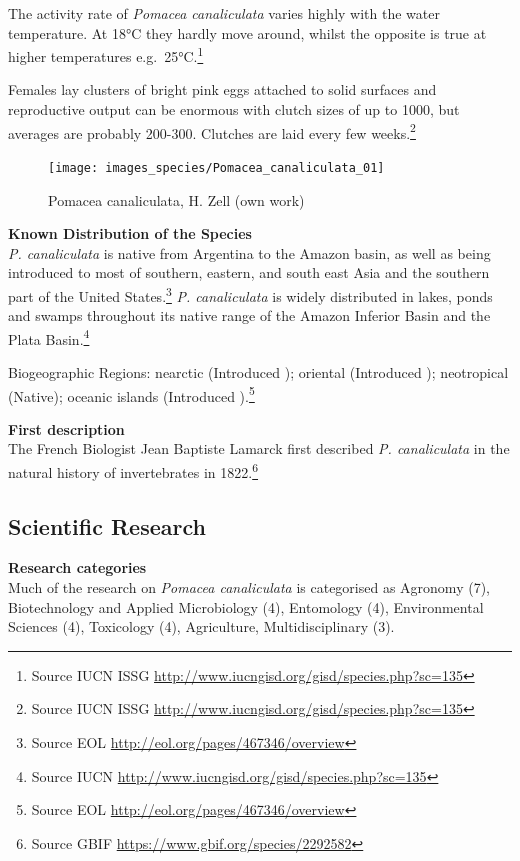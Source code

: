 \documentclass[]{book}
\let\rmarkdownfootnote\footnote%
\def\footnote{\protect\rmarkdownfootnote}
\theoremstyle{definition}
\theoremstyle{definition}
\theoremstyle{definition}
\theoremstyle{remark}
\begin{document}
The activity rate of \emph{Pomacea canaliculata} varies highly with the
water temperature. At 18°C they hardly move around, whilst the opposite
is true at higher temperatures e.g.~25°C.\footnote{Source IUCN ISSG
  \url{http://www.iucngisd.org/gisd/species.php?sc=135}}

Females lay clusters of bright pink eggs attached to solid surfaces and
reproductive output can be enormous with clutch sizes of up to 1000, but
averages are probably 200-300. Clutches are laid every few
weeks.\footnote{Source IUCN ISSG
  \url{http://www.iucngisd.org/gisd/species.php?sc=135}}

\begin{figure}

{\centering \texttt{[image: images\_species/Pomacea\_canaliculata\_01]} 

}

\caption{Pomacea canaliculata, H. Zell (own work)}\label{fig:unnamed-chunk-9}
\end{figure}

\textbf{Known Distribution of the Species}\\
\emph{P. canaliculata} is native from Argentina to the Amazon basin, as
well as being introduced to most of southern, eastern, and south east
Asia and the southern part of the United States.\footnote{Source EOL
  \url{http://eol.org/pages/467346/overview}} \emph{P. canaliculata} is
widely distributed in lakes, ponds and swamps throughout its native
range of the Amazon Inferior Basin and the Plata Basin.\footnote{Source
  IUCN \url{http://www.iucngisd.org/gisd/species.php?sc=135}}

Biogeographic Regions: nearctic (Introduced ); oriental (Introduced );
neotropical (Native); oceanic islands (Introduced ).\footnote{Source EOL
  \url{http://eol.org/pages/467346/overview}}

\textbf{First description}\\
The French Biologist Jean Baptiste Lamarck first described \emph{P.
canaliculata} in the natural history of invertebrates in 1822.\footnote{Source
  GBIF \url{https://www.gbif.org/species/2292582}}

\hypertarget{scientific-research-7}{%
\subsection{Scientific Research}\label{scientific-research-7}}

\textbf{Research categories}\\
Much of the research on \emph{Pomacea canaliculata} is categorised as
Agronomy (7), Biotechnology and Applied Microbiology (4), Entomology
(4), Environmental Sciences (4), Toxicology (4), Agriculture,
Multidisciplinary (3).
\end{document}

